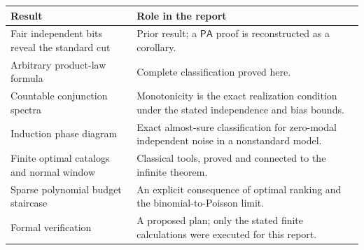 \documentclass[11pt]{article}
\numberwithin{equation}{section}
\theoremstyle{definition}
\theoremstyle{remark}
\newcommand{\PA}{\mathsf{PA}}
\begin{document}
\begin{center}
\begin{tabular}{p{}p{}}
\toprule
Result & Role in the report\\
\midrule
Fair independent bits reveal the standard cut & Prior result; a $\PA$ proof
is reconstructed as a corollary.\\
Arbitrary product-law formula & Complete classification proved here.\\
Countable conjunction spectra & Monotonicity is the exact realization
condition under the stated independence and bias bounds.\\
Induction phase diagram & Exact almost-sure classification for zero-modal
independent noise in a nonstandard model.\\
Finite optimal catalogs and normal window & Classical tools, proved and
connected to the infinite theorem.\\
Sparse polynomial budget staircase & An explicit consequence of optimal
ranking and the binomial-to-Poisson limit.\\
Formal verification & A proposed plan; only the stated finite calculations
were executed for this report.\\
\bottomrule
\end{tabular}
\end{center}
\end{document}
